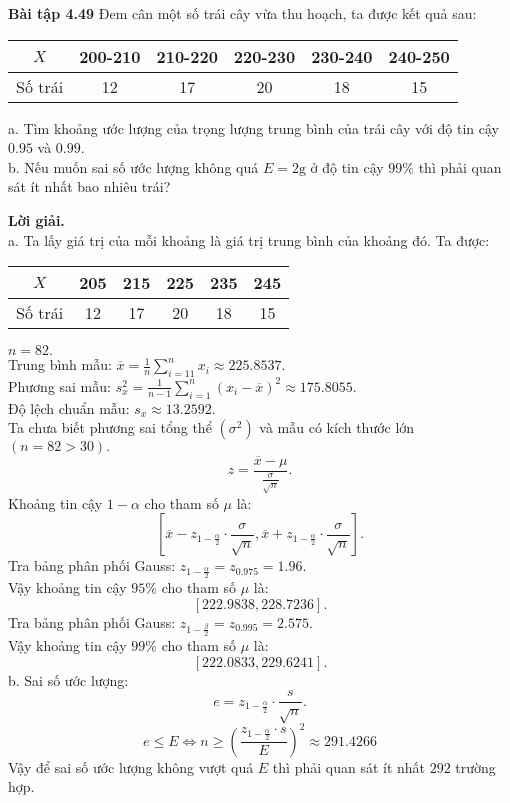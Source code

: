 \documentclass[12pt,a4paper]{article}
\begin{document}
\begin{mybox}
\textbf{Bài tập 4.49} Đem cân một số trái cây vừa thu hoạch, ta được kết quả sau:
\begin{table}[H]
\begin{tabular}{|c|c|c|c|c|c|}
\hline 
$X$ & 200-210 & 210-220 & 220-230 & 230-240 & 240-250 \\ 
\hline 
Số trái & 12 & 17 & 20 & 18 & 15 \\ 
\hline 
\end{tabular} 
\end{table}
a. Tìm khoảng ước lượng của trọng lượng trung bình của trái cây với độ tin cậy $0.95$ và $0.99.$\\
b. Nếu muốn sai số ước lượng không quá $E = 2 \mathrm{g}$ ở độ tin cậy $99\%$ thì phải quan sát ít nhất bao nhiêu trái?
\end{mybox}
\textbf{Lời giải.}\\
a.  Ta lấy giá trị của mỗi khoảng là giá trị trung bình của khoảng đó. Ta được:
\begin{table}[H]
\begin{tabular}{|c|c|c|c|c|c|}
\hline 
$X$ & 205 & 215 & 225 & 235 & 245 \\ 
\hline 
Số trái & 12 & 17 & 20 & 18 & 15 \\ 
\hline 
\end{tabular} 
\end{table}
$n = 82.$\\
Trung bình mẫu:
$\overline x  = \frac{1}{n}\sum\limits_{i =1 1}^n {{x_i}}  \approx 225.8537.$\\
Phương sai mẫu: $s_x^2 = \frac{1}{{n - 1}}\sum\limits_{i = 1}^n {{{\left( {{x_i} - \overline x } \right)}^2}}  \approx 175.8055.$\\
Độ lệch chuẩn mẫu: ${s_x} \approx 13.2592.$\\
Ta chưa biết phương sai tổng thể $\left( {\sigma^2} \right)$ và mẫu có kích thước lớn $\left( {n = 82 > 30} \right).$
$$z = \frac{\overline{x} - \mu}{\frac{\sigma}{\sqrt{n}}}.$$
Khoảng tin cậy $1 - \alpha$ cho tham số $\mu$ là:
$$\left[ {\overline{x} - z_{1 - \frac{\alpha}{2}} \cdot \frac{\sigma}{\sqrt{n}}, {\overline{x} + z_{1 - \frac{\alpha}{2}} \cdot \frac{\sigma}{\sqrt{n}}}} \right].$$
Tra bảng phân phối Gauss: $z_{1 - \frac{\alpha}{2}} = z_{0.975} = 1.96.$\\
Vậy khoảng tin cậy $95\%$ cho tham số $\mu$ là:
$$\left[ {222.9838, 228.7236} \right].$$
Tra bảng phân phối Gauss: $z_{1 - \frac{\beta}{2}} = z_{0.995} = 2.575.$\\
Vậy khoảng tin cậy $99\%$ cho tham số $\mu$ là:
$$\left[ {222.0833, 229.6241} \right].$$
b. Sai số ước lượng:
$$e = z_{1 - \frac{\alpha}{2}} \cdot \frac{s}{\sqrt{n}}.$$
$$e \leqslant E \Leftrightarrow n \geqslant {\left( {\frac{{{z_{1 - \frac{\alpha }{2}}} \cdot s}}{E}} \right)^2} \approx 291.4266$$
Vậy để sai số ước lượng không vượt quá $E$ thì phải quan sát ít nhất $292$ trường hợp.
\end{document}
